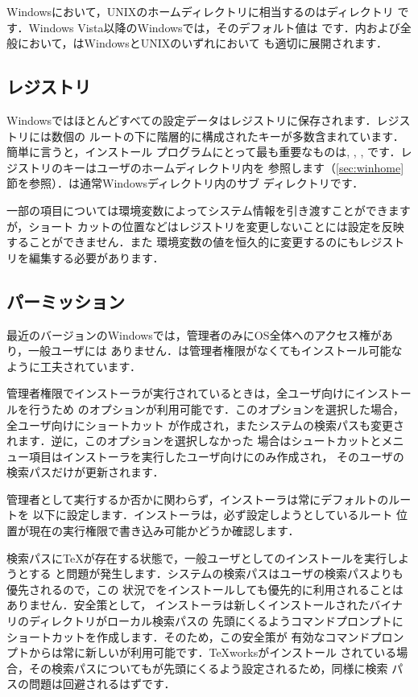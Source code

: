 \documentclass[uplatex,dvipdfmx,tombow]{jsarticle}
\begin{document}
Windowsにおいて，UNIXのホームディレクトリに相当するのはディレクトリ
です．Windows Vista以降のWindowsでは，そのデフォルト値は%
です．内および\KPS 全般において，\dir{~}はWindowsとUNIXのいずれにおいて
も適切に展開されます．

\subsection{レジストリ}
\label{sec:registry}

Windowsではほとんどすべての設定データはレジストリに保存されます．レジストリには数個の
ルートの下に階層的に構成されたキーが多数含まれています．簡単に言うと，インストール
プログラムにとって最も重要なものは, ,
, です．レジストリのキーはユーザのホームディレクトリ内を
参照します（\ref{sec:winhome}節を参照）．は通常Windowsディレクトリ内のサブ
ディレクトリです．

一部の項目については環境変数によってシステム情報を引き渡すことができますが，ショート
カットの位置などはレジストリを変更しないことには設定を反映することができません．また
環境変数の値を恒久的に変更するのにもレジストリを編集する必要があります．

\subsection{パーミッション}
\label{sec:winpermissions}

最近のバージョンのWindowsでは，管理者のみにOS全体へのアクセス権があり，一般ユーザには
ありません．\TL は管理者権限がなくてもインストール可能なように工夫されています．

管理者権限でインストーラが実行されているときは，全ユーザ向けにインストールを行うため
のオプションが利用可能です．このオプションを選択した場合，全ユーザ向けにショートカット
が作成され，またシステムの検索パスも変更されます．逆に，このオプションを選択しなかった
場合はシュートカットとメニュー項目はインストーラを実行したユーザ向けにのみ作成され，
そのユーザの検索パスだけが更新されます．

管理者として実行するか否かに関わらず，インストーラは常にデフォルトの\TL ルートを
以下に設定します．インストーラは，必ず設定しようとしているルート
位置が現在の実行権限で書き込み可能かどうか確認します．

検索パスに\TeX が存在する状態で，一般ユーザとして\TL のインストールを実行しようとする
と問題が発生します．システムの検索パスはユーザの検索パスよりも優先されるので，この
状況で\TL をインストールしても優先的に利用されることはありません．安全策として，
インストーラは新しくインストールされた\TL バイナリのディレクトリがローカル検索パスの
先頭にくるようコマンドプロンプトにショートカットを作成します．そのため，この安全策が
有効なコマンドプロンプトからは常に新しい\TL が利用可能です．\TeX worksがインストール
されている場合，その検索パスについても\TL が先頭にくるよう設定されるため，同様に検索
パスの問題は回避されるはずです．
\end{document}
